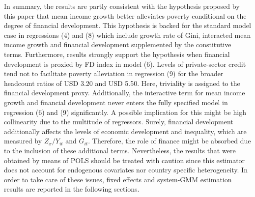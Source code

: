 \documentclass[12pt, a4paper]{article}
\begin{document}
In summary, the results are partly consistent with the hypothesis proposed by this paper that mean income growth better alleviates poverty conditional on the degree of financial development. This hypothesis is backed for the standard model case in regressions (4) and (8) which include growth rate of Gini, interacted mean income growth and financial development supplemented by the constitutive terms. Furthermore, results strongly support the hypothesis when financial development is proxied by FD index in model (6). Levels of private-sector credit tend not to facilitate poverty alleviation in regression (9) for the broader headcount ratios of USD 3.20 and USD 5.50. Here, triviality is assigned to the financial development proxy. Additionally, the interactive term for mean income growth and financial development never enters the fully specified model in regression (6) and (9) significantly. A possible implication for this might be high collinearity due to the multitude of regressors. Surely, financial development additionally affects the levels of economic development and inequality, which are measured by $Z_{x}/Y_{it}$ and $G_{it}$. Therefore, the role of finance might be absorbed due to the inclusion of these additional terms. Nevertheless, the results that were obtained by means of POLS should be treated with caution since this estimator does not account for endogenous covariates nor country specific heterogeneity. In order to take care of these issues, fixed effects and system-GMM estimation results are reported in the following sections.
\end{document}
